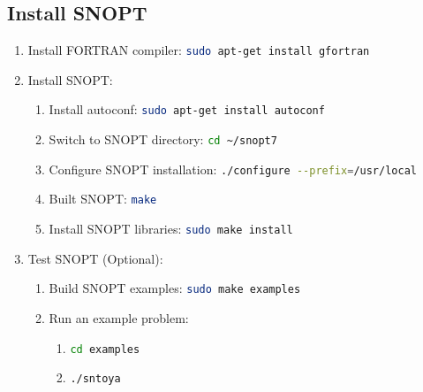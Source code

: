 \documentclass[letterpaper]{article}
\begin{document}
\subsection{Install SNOPT}
\begin{enumerate}
	\item Install FORTRAN compiler: \lstinline[language=bash]!sudo apt-get install gfortran!
	\item Install SNOPT:
		\begin{enumerate}
			\item Install autoconf: \lstinline[language=bash]!sudo apt-get install autoconf!
			\item Switch to SNOPT directory: \lstinline[language=bash]!cd ~/snopt7!
			\item Configure SNOPT installation: \lstinline[language=bash]!./configure --prefix=/usr/local!
			\item Built SNOPT: \lstinline[language=bash]!make!
			\item Install SNOPT libraries: \lstinline[language=bash]!sudo make install!
		\end{enumerate}
	\item Test SNOPT (Optional):
		\begin{enumerate}
			\item Build SNOPT examples: \lstinline[language=bash]!sudo make examples!
			\item Run an example problem:
				\begin{enumerate}
					\item \lstinline[language=bash]!cd examples!
					\item \lstinline[language=bash]!./sntoya!
				\end{enumerate}
		\end{enumerate}
\end{enumerate}
\end{document}
